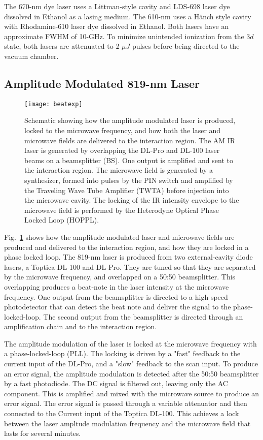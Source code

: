\documentclass[aps,pra,preprint,groupedaddress]{revtex4-1}
\begin{document}
The 670-nm dye laser uses a Littman-style cavity and LDS-698 laser dye dissolved in Ethanol as a lasing medium. The 610-nm uses a H{\"a}nch style cavity with Rhodamine-610 laser dye dissolved in Ethanol. Both lasers have an approximate FWHM of 10-GHz. To minimize unintended ionization from the $3d$ state, both lasers are attenuated to 2 $\mu J$ pulses before being directed to the vacuum chamber.

\subsection{Amplitude Modulated 819-nm Laser}
\label{sec:ampmod}

\begin{figure}
	\texttt{[image: beatexp]}
	\caption{Schematic showing how the amplitude modulated laser is produced, locked to the microwave frequency, and how both the laser and microwave fields are delivered to the interaction region. The AM IR laser is generated by overlapping the DL-Pro and DL-100 laser beams on a beamsplitter (BS). One output is amplified and sent to the interaction region. The microwave field is generated by a synthesizer, formed into pulses by the PIN switch and amplified by the Traveling Wave Tube Amplifier (TWTA) before injection into the microwave cavity. The locking of the IR intensity envelope to the microwave field is performed by the Heterodyne Optical Phase Locked Loop (HOPPL).}
	\label{fig:pll}
\end{figure}

Fig.~\ref{fig:pll} shows how the amplitude modulated laser and microwave fields are produced and delivered to the interaction region, and how they are locked in a phase locked loop. The 819-nm laser is produced from two external-cavity diode lasers, a Toptica DL-100 and DL-Pro. They are tuned so that they are separated by the microwave frequency, and overlapped on a 50:50 beamsplitter. This overlapping produces a beat-note in the laser intensity at the microwave frequency. One output from the beamsplitter is directed to a high speed photodetector that can detect the beat note and deliver the signal to the phase-locked-loop. The second output from the beamsplitter is directed through an amplification chain and to the interaction region.

The amplitude modulation of the laser is locked at the microwave frequency with a phase-locked-loop (PLL). The locking is driven by a "fast" feedback to the current input of the DL-Pro, and a "slow" feedback to the scan input. To produce an error signal, the amplitude modulation is detected after the 50:50 beamsplitter by a fast photodiode. The DC signal is filtered out, leaving only the AC component. This is amplified and mixed with the microwave source to produce an error signal. The error signal is passed through a variable attenuator and then connected to the Current input of the Toptica DL-100. This achieves a lock between the laser ampltude modulation frequency and the microwave field that lasts for several minutes.
\end{document}
